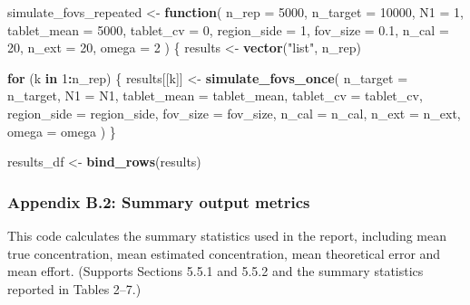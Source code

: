 \documentclass[
  12pt,
]{article}
\newenvironment{Shaded}{\begin{snugshade}}{\end{snugshade}}
\newcommand{\AttributeTok}[1]{\textcolor[rgb]{0.13,0.29,0.53}{#1}}
\newcommand{\ControlFlowTok}[1]{\textcolor[rgb]{0.13,0.29,0.53}{\textbf{#1}}}
\newcommand{\DecValTok}[1]{\textcolor[rgb]{0.00,0.00,0.81}{#1}}
\newcommand{\FloatTok}[1]{\textcolor[rgb]{0.00,0.00,0.81}{#1}}
\newcommand{\FunctionTok}[1]{\textcolor[rgb]{0.13,0.29,0.53}{\textbf{#1}}}
\newcommand{\NormalTok}[1]{#1}
\newcommand{\OtherTok}[1]{\textcolor[rgb]{0.56,0.35,0.01}{#1}}
\newcommand{\SpecialCharTok}[1]{\textcolor[rgb]{0.81,0.36,0.00}{\textbf{#1}}}
\newcommand{\StringTok}[1]{\textcolor[rgb]{0.31,0.60,0.02}{#1}}
\begin{document}
\begin{Shaded}
\begin{Highlighting}[]
\NormalTok{simulate\_fovs\_repeated }\OtherTok{\textless{}{-}} \ControlFlowTok{function}\NormalTok{(}
  \AttributeTok{n\_rep =} \DecValTok{5000}\NormalTok{,}
  \AttributeTok{n\_target =} \DecValTok{10000}\NormalTok{,}
  \AttributeTok{N1 =} \DecValTok{1}\NormalTok{,}
  \AttributeTok{tablet\_mean =} \DecValTok{5000}\NormalTok{,}
  \AttributeTok{tablet\_cv =} \DecValTok{0}\NormalTok{,}
  \AttributeTok{region\_side =} \DecValTok{1}\NormalTok{,}
  \AttributeTok{fov\_size =} \FloatTok{0.1}\NormalTok{,}
  \AttributeTok{n\_cal =} \DecValTok{20}\NormalTok{,}
  \AttributeTok{n\_ext =} \DecValTok{20}\NormalTok{,}
  \AttributeTok{omega =} \DecValTok{2}
\NormalTok{) \{}
\NormalTok{  results }\OtherTok{\textless{}{-}} \FunctionTok{vector}\NormalTok{(}\StringTok{"list"}\NormalTok{, n\_rep)}

  \ControlFlowTok{for}\NormalTok{ (k }\ControlFlowTok{in} \DecValTok{1}\SpecialCharTok{:}\NormalTok{n\_rep) \{}
\NormalTok{    results[[k]] }\OtherTok{\textless{}{-}} \FunctionTok{simulate\_fovs\_once}\NormalTok{(}
      \AttributeTok{n\_target =}\NormalTok{ n\_target,}
      \AttributeTok{N1 =}\NormalTok{ N1,}
      \AttributeTok{tablet\_mean =}\NormalTok{ tablet\_mean,}
      \AttributeTok{tablet\_cv =}\NormalTok{ tablet\_cv,}
      \AttributeTok{region\_side =}\NormalTok{ region\_side,}
      \AttributeTok{fov\_size =}\NormalTok{ fov\_size,}
      \AttributeTok{n\_cal =}\NormalTok{ n\_cal,}
      \AttributeTok{n\_ext =}\NormalTok{ n\_ext,}
      \AttributeTok{omega =}\NormalTok{ omega}
\NormalTok{    )}
\NormalTok{  \}}

\NormalTok{  results\_df }\OtherTok{\textless{}{-}} \FunctionTok{bind\_rows}\NormalTok{(results)}
\end{Highlighting}
\end{Shaded}

\subsubsection{Appendix B.2: Summary output
metrics}\label{appendix-b.2-summary-output-metrics}

This code calculates the summary statistics used in the report,
including mean true concentration, mean estimated concentration, mean
theoretical error and mean effort. (Supports Sections 5.5.1 and 5.5.2
and the summary statistics reported in Tables 2--7.)
\end{document}
